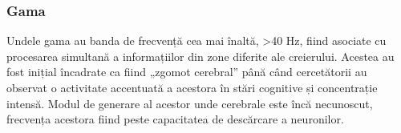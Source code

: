 \subsubsection*{Gama}\label{sush:gama}
Undele gama au banda de frecvență cea mai înaltă, >40 \si{\hertz}, fiind asociate cu procesarea simultană a informațiilor din zone diferite ale creierului. Acestea au fost inițial încadrate ca fiind „zgomot cerebral” până când cercetătorii au observat o activitate accentuată a acestora în stări cognitive și concentrație intensă. Modul de generare al acestor unde cerebrale este încă necunoscut, frecvența acestora fiind peste capacitatea de descărcare a neuronilor. 
